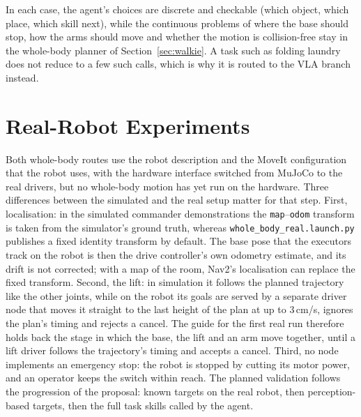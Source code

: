 \documentclass[12pt,a4paper]{article}
\begin{document}
In each case, the agent's choices are discrete and checkable (which object, which place, which skill
next), while the continuous problems of where the base should stop, how the arms should move and
whether the motion is collision-free stay in the whole-body planner of Section~\ref{sec:walkie}. A
task such as folding laundry does not reduce to a few such calls, which is why it is routed to the
VLA branch instead.

\section{Real-Robot Experiments}
\label{sec:real}

Both whole-body routes use the robot description and the MoveIt configuration that the robot uses,
with the hardware interface switched from MuJoCo to the real drivers, but no whole-body motion has yet
run on the hardware. Three differences between the simulated and the real setup matter for that step.
First, localisation: in the simulated commander demonstrations the \texttt{map}--\texttt{odom}
transform is taken from the simulator's ground truth, whereas \texttt{whole\_body\_real.launch.py}
publishes a fixed identity transform by default. The base pose that the executors track on the robot
is then the drive controller's own odometry estimate, and its drift is not corrected; with a map of
the room, Nav2's localisation can replace the fixed transform. Second, the lift: in simulation it
follows the planned trajectory like the other joints, while on the robot its goals are served by a
separate driver node that moves it straight to the last height of the plan at up to 3\,cm/s, ignores
the plan's timing and rejects a cancel. The guide for the first real run therefore holds back the
stage in which the base, the lift and an arm move together, until a lift driver follows the
trajectory's timing and accepts a cancel. Third, no node implements an emergency stop: the robot is
stopped by cutting its motor power, and an operator keeps the switch within reach. The planned
validation follows the progression of the proposal: known targets on the real robot, then
perception-based targets, then the full task skills called by the agent.
\end{document}

